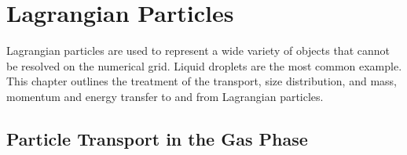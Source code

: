 

\chapter{Lagrangian Particles}
\label{chapter:lagrangian_particles}

Lagrangian particles are used to represent a wide variety of objects that cannot be resolved on
the numerical grid. Liquid droplets are the most common example. This chapter outlines the treatment of the transport, size
distribution, and mass, momentum and energy transfer to and from Lagrangian particles.

\section{Particle Transport in the Gas Phase}

